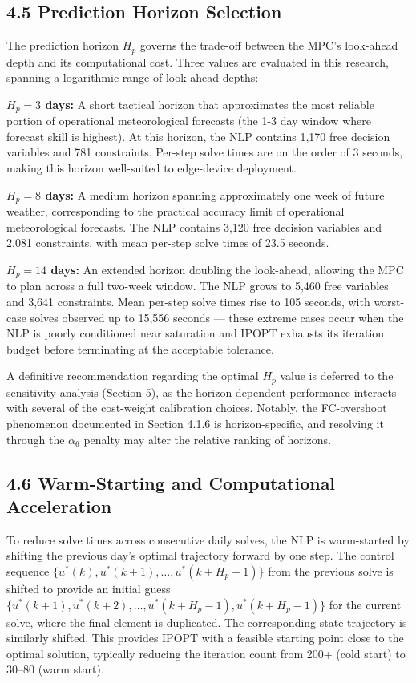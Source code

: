 \subsection{4.5 Prediction Horizon
Selection}\label{prediction-horizon-selection}

The prediction horizon \(H_p\) governs the trade-off between the MPC's
look-ahead depth and its computational cost. Three values are evaluated
in this research, spanning a logarithmic range of look-ahead depths:

\textbf{\(H_p = 3\) days:} A short tactical horizon that approximates
the most reliable portion of operational meteorological forecasts (the
1-3 day window where forecast skill is highest). At this horizon, the
NLP contains 1,170 free decision variables and 781 constraints. Per-step
solve times are on the order of 3 seconds, making this horizon
well-suited to edge-device deployment.

\textbf{\(H_p = 8\) days:} A medium horizon spanning approximately one
week of future weather, corresponding to the practical accuracy limit of
operational meteorological forecasts. The NLP contains 3,120 free
decision variables and 2,081 constraints, with mean per-step solve times
of 23.5 seconds.

\textbf{\(H_p = 14\) days:} An extended horizon doubling the look-ahead,
allowing the MPC to plan across a full two-week window. The NLP grows to
5,460 free variables and 3,641 constraints. Mean per-step solve times
rise to 105 seconds, with worst-case solves observed up to 15,556
seconds --- these extreme cases occur when the NLP is poorly conditioned
near saturation and IPOPT exhausts its iteration budget before
terminating at the acceptable tolerance.

A definitive recommendation regarding the optimal \(H_p\) value is
deferred to the sensitivity analysis (Section 5), as the
horizon-dependent performance interacts with several of the cost-weight
calibration choices. Notably, the FC-overshoot phenomenon documented in
Section 4.1.6 is horizon-specific, and resolving it through the
\(\alpha_6\) penalty may alter the relative ranking of horizons.

\subsection{4.6 Warm-Starting and Computational
Acceleration}\label{warm-starting-and-computational-acceleration}

To reduce solve times across consecutive daily solves, the NLP is
warm-started by shifting the previous day's optimal trajectory forward
by one step. The control sequence
\(\{u^*(k), u^*(k+1), \ldots, u^*(k + H_p - 1)\}\) from the previous
solve is shifted to provide an initial guess
\(\{u^*(k+1), u^*(k+2), \ldots, u^*(k + H_p - 1), u^*(k + H_p - 1)\}\)
for the current solve, where the final element is duplicated. The
corresponding state trajectory is similarly shifted. This provides IPOPT
with a feasible starting point close to the optimal solution, typically
reducing the iteration count from 200+ (cold start) to 30--80 (warm
start).

